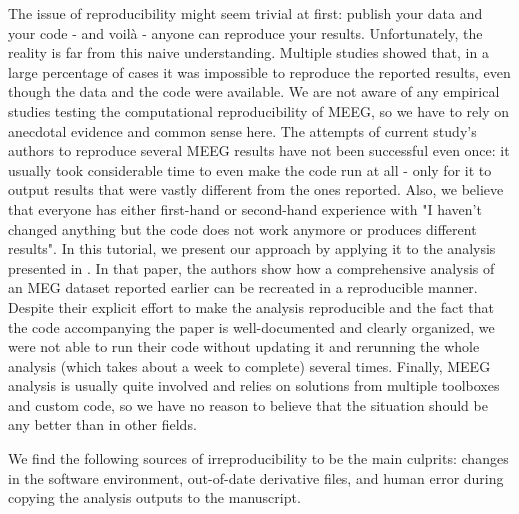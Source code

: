 \documentclass[a4paper,man,floatsintext,natbib]{apa6}
\begin{document}
The issue of reproducibility might seem trivial at first: publish your data and your code - and voilà - anyone can reproduce your results. Unfortunately, the reality is far from this naive understanding. Multiple studies \citep{stockemerDataAccessTransparency2018,obelsAnalysisOpenData2020,hardwickeDataAvailabilityReusability2018} showed that, in a large percentage of cases it was impossible to reproduce the reported results, even though the data and the code were available. We are not aware of any empirical studies testing the computational reproducibility of MEEG, so we have to rely on anecdotal evidence and common sense here. The attempts of current study's authors to reproduce several MEEG results have not been successful even once: it usually took considerable time to even make the code run at all - only for it to output results that were vastly different from the ones reported. Also, we believe that everyone has either first-hand or second-hand experience with "I haven't changed anything but the code does not work anymore or produces different results". In this tutorial, we present our approach by applying it to the analysis presented in \cite{jasReproducibleMEGEEG2018a}. In that paper, the authors show how a comprehensive analysis of an MEG dataset reported earlier \citep{wakemanMultisubjectMultimodalHuman2015} can be recreated in a reproducible manner. Despite their explicit effort to make the analysis reproducible and the fact that the code accompanying the paper is well-documented and clearly organized, we were not able to run their code without updating it and rerunning the whole analysis (which takes about a week to complete) several times. Finally, MEEG analysis is usually quite involved and relies on solutions from multiple toolboxes and custom code, so we have no reason to believe that the situation should be any better than in other fields.

We find the following sources of irreproducibility to be the main culprits: changes in the software environment, out-of-date derivative files, and human error during copying the analysis outputs to the manuscript.
\end{document}
